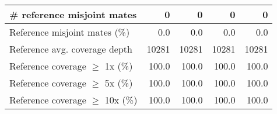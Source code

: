 \documentclass[12pt,a4paper]{article}
\begin{document}
\begin{table}[ht]
\begin{center}
\begin{tabular}{|l*{4}{|r}|}
\# reference misjoint mates & 0 & 0 & 0 & 0 \\ \hline
Reference misjoint mates (\%) & 0.0 & 0.0 & 0.0 & 0.0 \\ \hline
Reference avg. coverage depth & 10281 & 10281 & 10281 & 10281 \\ \hline
Reference coverage $\geq$ 1x (\%) & 100.0 & 100.0 & 100.0 & 100.0 \\ \hline
Reference coverage $\geq$ 5x (\%) & 100.0 & 100.0 & 100.0 & 100.0 \\ \hline
Reference coverage $\geq$ 10x (\%) & 100.0 & 100.0 & 100.0 & 100.0 \\ \hline
\end{tabular}
\end{center}
\end{table}
\end{document}
